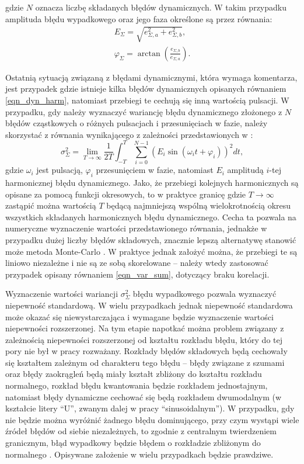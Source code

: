 gdzie $N$ oznacza liczbę składanych błędów dynamicznych. W takim przypadku amplituda błędu wypadkowego oraz jego faza określone są przez równania:
\begin{gather}
E_{\Sigma} = \sqrt{e_{\Sigma,a}^{2} + e_{\Sigma,b}^{2}} \label{eqn_dyn_vect_amp}, \\
\varphi_{\Sigma} = \arctan \left( \frac{e_{\Sigma,b}}{e_{\Sigma,a}} \right) \label{eqn_dyn_vect_phi}.
\end{gather}

Ostatnią sytuacją związaną z błędami dynamicznymi, która wymaga komentarza, jest przypadek gdzie istnieje kilka błędów dynamicznych opisanych równaniem \eqref{eqn_dyn_harm}, natomiast przebiegi te cechują się inną wartością pulsacji. W przypadku, gdy należy wyznaczyć wariancję błędu dynamicznego złożonego z $N$ błędów cząstkowych o różnych pulsacjach i przesunięciach w fazie, należy skorzystać z równania wynikającego z zależności przedstawionych w \cite{proakis_dsp}:
\begin{equation}
\sigma_{\Sigma}^{2} = \lim _{T \to \infty} \frac{1}{2T} \int _{-T} ^{T} \sum _{i = 0} ^{N -1} \left( E_{i} \sin \left( \omega_{i} t + \varphi_{i} \right) \right)^{2} dt \label{eqn_dyn_multi},
\end{equation}
gdzie $\omega_{i}$ jest pulsacją, $\varphi_{i}$ przesunięciem w fazie, natomiast $E_{i}$ amplitudą $i$-tej harmonicznej błędu dynamicznego. Jako, że przebiegi kolejnych harmonicznych są opisane za pomocą funkcji okresowych, to w praktyce granicę gdzie $T \to \infty$ zastąpić można wartością $T$ będącą najmniejszą wspólną wielokrotnością okresu wszystkich składanych harmonicznych błędu dynamicznego. Cecha ta pozwala na numeryczne wyznaczenie wartości przedstawionego równania, jednakże w przypadku dużej liczby błędów składowych, znacznie lepszą alternatywę stanowić może metoda Monte-Carlo \cite{roj_annuncertainty, janssen_montecarlo}. W praktyce jednak założyć można, że przebiegi te są liniowo niezależne i nie są ze sobą skorelowane \cite{proakis_dsp} -- należy wtedy zastosować przypadek opisany równaniem \eqref{eqn_var_sum}, dotyczący braku korelacji.

Wyznaczenie wartości wariancji $\sigma_{\Sigma}^{2}$ błędu wypadkowego pozwala wyznaczyć niepewność standardową. W wielu przypadkach jednak niepewność standardowa może okazać się niewystarczająca i wymagane będzie wyznaczenie wartości niepewności rozszerzonej. Na tym etapie napotkać można problem związany z zależnością niepewności rozszerzonej od kształtu rozkładu błędu, który do tej pory nie był w pracy rozważany. Rozkłady błędów składowych będą cechowały się kształtem zależnym od charakteru tego błędu -- błędy związane z szumami oraz błędy zaokrągleń będą miały kształt zbliżony do kształtu rozkładu normalnego, rozkład błędu kwantowania będzie rozkładem jednostajnym, natomiast błędy dynamiczne cechować się będą rozkładem dwumodalnym (w kształcie litery \enquote{U}, zwanym dalej w pracy \enquote{sinusoidalnym}). W przypadku, gdy nie będzie można wyróżnić żadnego błędu dominującego, przy czym wystąpi wiele źródeł błędów od siebie niezależnych, to zgodnie z centralnym twierdzeniem granicznym, błąd wypadkowy będzie błędem o rozkładzie zbliżonym do normalnego \cite{jcgm_guide}. Opisywane założenie w wielu przypadkach będzie prawdziwe.

